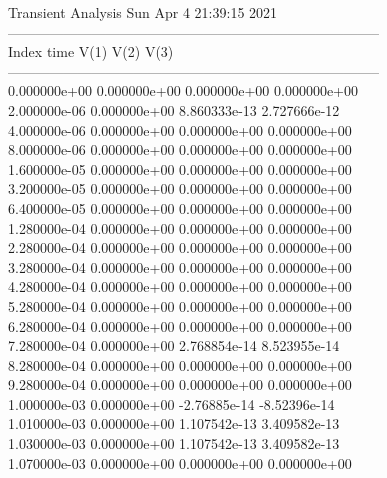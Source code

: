                                    Transient Analysis  Sun Apr  4 21:39:15  2021\\ \hline
--------------------------------------------------------------------------------\\ \hline
Index   time            V(1)            V(2)            V(3)            \\ \hline
--------------------------------------------------------------------------------\\ 	0.000000e+00	0.000000e+00	0.000000e+00	0.000000e+00	\\ 	2.000000e-06	0.000000e+00	8.860333e-13	2.727666e-12	\\ 	4.000000e-06	0.000000e+00	0.000000e+00	0.000000e+00	\\ 	8.000000e-06	0.000000e+00	0.000000e+00	0.000000e+00	\\ 	1.600000e-05	0.000000e+00	0.000000e+00	0.000000e+00	\\ 	3.200000e-05	0.000000e+00	0.000000e+00	0.000000e+00	\\ 	6.400000e-05	0.000000e+00	0.000000e+00	0.000000e+00	\\ 	1.280000e-04	0.000000e+00	0.000000e+00	0.000000e+00	\\ 	2.280000e-04	0.000000e+00	0.000000e+00	0.000000e+00	\\ 	3.280000e-04	0.000000e+00	0.000000e+00	0.000000e+00	\\ 	4.280000e-04	0.000000e+00	0.000000e+00	0.000000e+00	\\ 	5.280000e-04	0.000000e+00	0.000000e+00	0.000000e+00	\\ 	6.280000e-04	0.000000e+00	0.000000e+00	0.000000e+00	\\ 	7.280000e-04	0.000000e+00	2.768854e-14	8.523955e-14	\\ 	8.280000e-04	0.000000e+00	0.000000e+00	0.000000e+00	\\ 	9.280000e-04	0.000000e+00	0.000000e+00	0.000000e+00	\\ 	1.000000e-03	0.000000e+00	-2.76885e-14	-8.52396e-14	\\ 	1.010000e-03	0.000000e+00	1.107542e-13	3.409582e-13	\\ 	1.030000e-03	0.000000e+00	1.107542e-13	3.409582e-13	\\ 	1.070000e-03	0.000000e+00	0.000000e+00	0.000000e+00	\\ \hline
